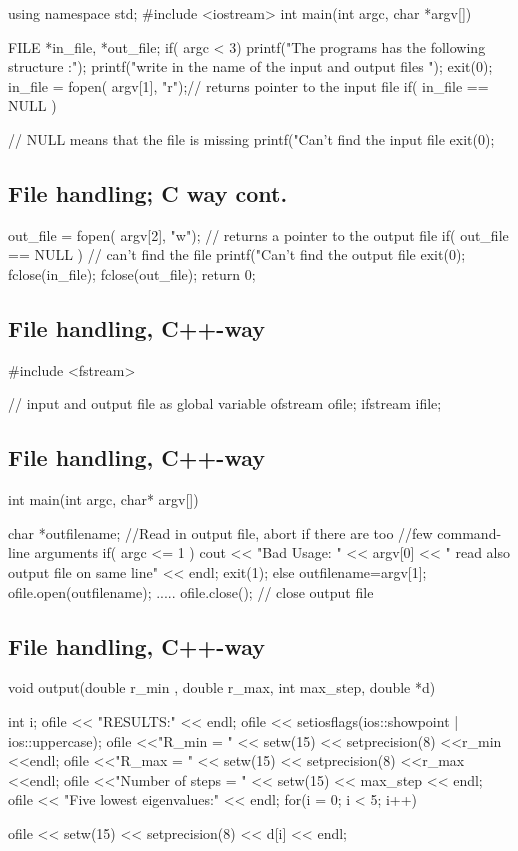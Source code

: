 \documentclass[%
oneside,                 %
final,                   %
10pt]{article}
\begin{document}
\bcppcod
using namespace std;
#include <iostream>
int main(int argc, char *argv[])
{
  FILE *in_file, *out_file;
  if( argc < 3)  {
    printf("The programs has the following structure :\n");
    printf("write in the name of the input and output files \n");
    exit(0);
  }
  in_file = fopen( argv[1], "r");// returns pointer to the  input file
  if( in_file == NULL )  { // NULL means that the file is missing
    printf("Can't find the input file %
    exit(0);
\ecppcod

\subsection{File handling; C way cont.}

\bcppcod
 out_file = fopen( argv[2], "w"); // returns a pointer to the output file
 if( out_file == NULL )  {       // can't find the file
    printf("Can't find the output file%
    exit(0);
  }
  fclose(in_file);
  fclose(out_file);
  return 0;
\ecppcod

\subsection{File handling, C++-way}

\bcppcod
#include <fstream>

// input and output file as global variable
ofstream ofile;
ifstream ifile;
\ecppcod

\subsection{File handling, C++-way}

\bcppcod
int main(int argc, char* argv[])
{
  char *outfilename;
  //Read in output file, abort if there are too
  //few command-line arguments
  if( argc <= 1 ){
    cout << "Bad Usage: " << argv[0] <<
      " read also output file on same line" << endl;
    exit(1);
  }
  else{
    outfilename=argv[1];
  }
  ofile.open(outfilename);
  .....
  ofile.close();  // close output file
\ecppcod

\subsection{File handling, C++-way}

\bcppcod
void output(double r_min , double r_max, int max_step,
            double *d)
{
int i;
ofile << "RESULTS:" << endl;
ofile << setiosflags(ios::showpoint | ios::uppercase);
ofile <<"R_min = " << setw(15) << setprecision(8) <<r_min <<endl;
ofile <<"R_max = " << setw(15) << setprecision(8) <<r_max <<endl;
ofile <<"Number of steps = " << setw(15) << max_step << endl;
ofile << "Five lowest eigenvalues:" << endl;
for(i = 0; i < 5; i++) {
    ofile << setw(15) << setprecision(8) << d[i] << endl;

}}}}}
\end{document}
